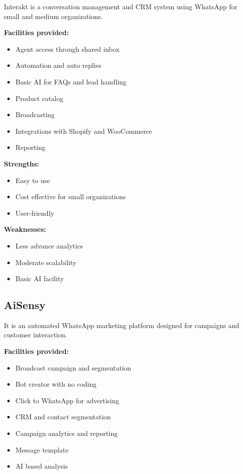 Interakt is a conversation management and CRM system using WhatsApp for small and medium organizations.

\textbf{Facilities provided:}
\begin{itemize}
    \item Agent access through shared inbox
    \item Automation and auto replies
    \item Basic AI for FAQs and lead handling
    \item Product catalog
    \item Broadcasting
    \item Integrations with Shopify and WooCommerce
    \item Reporting
\end{itemize}

\textbf{Strengths:}
\begin{itemize}
    \item Easy to use
    \item Cost effective for small organizations
    \item User-friendly
\end{itemize}

\textbf{Weaknesses:}
\begin{itemize}
    \item Less advance analytics
    \item Moderate scalability
    \item Basic AI facility
\end{itemize}


\subsection{AiSensy}

It is an automated WhatsApp marketing platform designed for campaigns and customer interaction.

\textbf{Facilities provided:}
\begin{itemize}
    \item Broadcast campaign and segmentation
    \item Bot creator with no coding
    \item Click to WhatsApp for advertising
    \item CRM and contact segmentation
    \item Campaign analytics and reporting
    \item Message template
    \item AI based analysis
\end{itemize}

